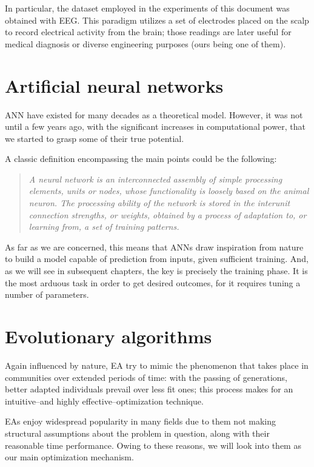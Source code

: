 	In particular, the dataset employed in the experiments of this document was obtained with \acs{EEG}. This paradigm utilizes a set of electrodes placed on the scalp to record electrical activity from the brain; those readings are later useful for medical diagnosis or diverse engineering purposes (ours being one of them).

\section{Artificial neural networks}

	\ac{ANN} have existed for many decades as a theoretical model. However, it was not until a few years ago, with the significant increases in computational power, that we started to grasp some of their true potential.

	A classic definition encompassing the main points could be the following: 

	\begin{quotation}
		\textit{A neural network is an interconnected assembly of simple processing elements, units or nodes, whose functionality is loosely based on the animal neuron. The processing ability of the network is stored in the interunit connection strengths, or weights, obtained by a process of adaptation to, or learning from, a set of training patterns. \cite{nnintro}}
	\end{quotation}

	As far as we are concerned, this means that \acs{ANN}s draw inspiration from nature to build a model capable of prediction from inputs, given sufficient training. And, as we will see in subsequent chapters, the key is precisely the training phase. It is the most arduous task in order to get desired outcomes, for it requires tuning a number of parameters.

\section{Evolutionary algorithms}

	Again influenced by nature, \ac{EA} try to mimic the phenomenon that takes place in communities over extended periods of time: with the passing of generations, better adapted individuals prevail over less fit ones; this process makes for an intuitive--and highly effective--optimization technique.

	\acs{EA}s enjoy widespread popularity in many fields due to them not making structural assumptions about the problem in question, along with their reasonable time performance. Owing to these reasons, we will look into them as our main optimization mechanism.

